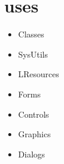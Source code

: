 \documentclass{report}
\begin{document}
\section{uses}
\begin{itemize}
\item \begin{ttfamily}Classes\end{ttfamily}\item \begin{ttfamily}SysUtils\end{ttfamily}\item \begin{ttfamily}LResources\end{ttfamily}\item \begin{ttfamily}Forms\end{ttfamily}\item \begin{ttfamily}Controls\end{ttfamily}\item \begin{ttfamily}Graphics\end{ttfamily}\item \begin{ttfamily}Dialogs\end{ttfamily}
\end{itemize}
\end{document}
